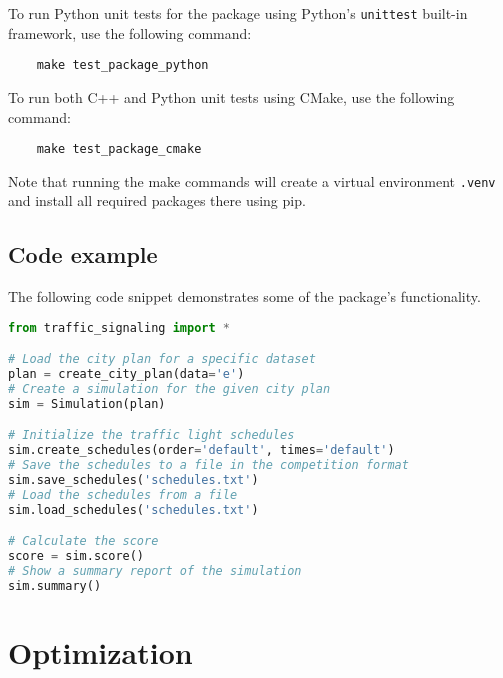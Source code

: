 \bigskip

To run Python unit tests for the package using Python's \verb|unittest| built-in framework, use the following command:
\begin{verbatim}
    make test_package_python
\end{verbatim}
To run both C++ and Python unit tests using CMake, use the following command:
\begin{verbatim}
    make test_package_cmake
\end{verbatim}
Note that running the make commands will create a virtual environment \verb|.venv| and install all required packages there using pip.

\subsection{Code example}

The following code snippet demonstrates some of the package's functionality. 

\begin{lstlisting}[language=Python]
from traffic_signaling import *

# Load the city plan for a specific dataset
plan = create_city_plan(data='e')
# Create a simulation for the given city plan
sim = Simulation(plan)

# Initialize the traffic light schedules
sim.create_schedules(order='default', times='default')
# Save the schedules to a file in the competition format
sim.save_schedules('schedules.txt')
# Load the schedules from a file
sim.load_schedules('schedules.txt')

# Calculate the score
score = sim.score()
# Show a summary report of the simulation
sim.summary()
\end{lstlisting}

\bigskip

\section{Optimization}


